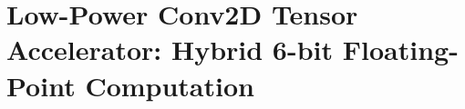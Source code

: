 \chapter{Low-Power Conv2D Tensor Accelerator: Hybrid 6-bit Floating-Point Computation}\label{chap.cnn}
\minitoc
\newpage

%






